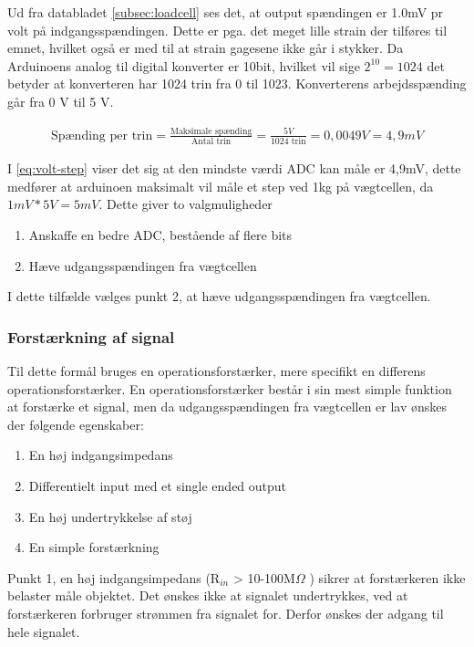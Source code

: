 Ud fra databladet \ref{subsec:loadcell} ses det, at output spændingen er 1.0mV pr volt på indgangsspændingen. Dette er pga. det meget lille strain der tilføres til emnet, hvilket også er med til at strain gagesene ikke går i stykker. Da Arduinoens analog til digital konverter er 10bit, hvilket vil sige $2^{10}=1024$ det betyder at konverteren har 1024 trin fra 0 til 1023. Konverterens arbejdsspænding går fra 0 V til 5 V. 

\begin{align}
 \text{Spænding per trin}=\frac{\text{Maksimale spænding}}{\text{Antal trin}}=\frac{5 V}{1024\text{ trin}}=0,0049V=4,9mV
 \label{eq:volt-step}
 \end{align}
 
I \ref{eq:volt-step} viser det sig at den mindste værdi ADC kan måle er 4,9mV, dette medfører at arduinoen maksimalt vil måle et step ved 1kg på vægtcellen, da $1mV*5V=5mV$. Dette giver to valgmuligheder
\begin{enumerate}
\item Anskaffe en bedre ADC, bestående af flere bits
\item Hæve udgangsspændingen fra vægtcellen 
\end{enumerate}
I dette tilfælde vælges punkt 2, at hæve udgangsspændingen fra vægtcellen. 
\subsubsection{Forstærkning af signal}
Til dette formål bruges en operationsforstærker, mere specifikt en differens operationsforstærker. En operationsforstærker består i sin mest simple funktion at forstærke et signal, men da udgangsspændingen fra vægtcellen er lav ønskes der følgende egenskaber:
\begin{enumerate}
\item En høj indgangsimpedans 
\item Differentielt input med et single ended output
\item En høj undertrykkelse af støj
\item En simple forstærkning
\end{enumerate}
Punkt 1, en høj indgangsimpedans (R$_{in}$ > 10-100M$\Omega$ ) sikrer at forstærkeren ikke belaster måle objektet. Det ønskes ikke at signalet undertrykkes, ved at forstærkeren forbruger strømmen fra signalet for. Derfor ønskes der adgang til hele signalet.

